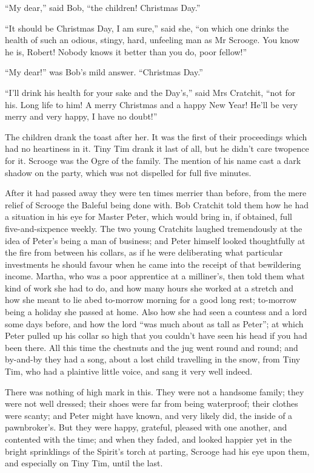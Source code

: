 \documentclass[paper=5.5in:8.5in,BCOR=7mm,twoside,DIV=calc,12pt,usegeometry]{scrbook} %
\begin{document}
\enquote{My dear,} said Bob, \enquote{the children! Christmas Day.}

\enquote{It should be Christmas Day, I am sure,} said she, \enquote{on which one drinks the health of such an odious, stingy, hard, unfeeling man as Mr Scrooge. You know he is, Robert! Nobody knows it better than you do, poor fellow!}

\enquote{My dear!} was Bob's mild answer. \enquote{Christmas Day.}

\enquote{I'll drink his health for your sake and the Day's,} said Mrs Cratchit, \enquote{not for his. Long life to him! A merry Christmas and a happy New Year! He'll be very merry and very happy, I have no doubt!}

The children drank the toast after her. It was the first of their proceedings which had no heartiness in it. Tiny Tim drank it last of all, but he didn't care twopence for it. Scrooge was the Ogre of the family. The mention of his name cast a dark shadow on the party, which was not dispelled for full five minutes.

After it had passed away they were ten times merrier than before, from the mere relief of Scrooge the Baleful being done with. Bob Cratchit told them how he had a situation in his eye for Master Peter, which would bring in, if obtained, full five-and-sixpence weekly. The two young Cratchits laughed tremendously at the idea of Peter's being a man of business; and Peter himself looked thoughtfully at the fire from between his collars, as if he were deliberating what particular investments he should favour when he came into the receipt of that bewildering income. Martha, who was a poor apprentice at a milliner's, then told them what kind of work she had to do, and how many hours she worked at a stretch and how she meant to lie abed to-morrow morning for a good long rest; to-morrow being a holiday she passed at home. Also how she had seen a countess and a lord some days before, and how the lord \enquote{was much about as tall as Peter}; at which Peter pulled up his collar so high that you couldn't have seen his head if you had been there. All this time the chestnuts and the jug went round and round; and by-and-by they had a song, about a lost child travelling in the snow, from Tiny Tim, who had a plaintive little voice, and sang it very well indeed.

There was nothing of high mark in this. They were not a handsome family; they were not well dressed; their shoes were far from being waterproof; their clothes were scanty; and Peter might have known, and very likely did, the inside of a pawnbroker's. But they were happy, grateful, pleased with one another, and contented with the time; and when they faded, and looked happier yet in the bright sprinklings of the Spirit's torch at parting, Scrooge had his eye upon them, and especially on Tiny Tim, until the last.
\end{document}
